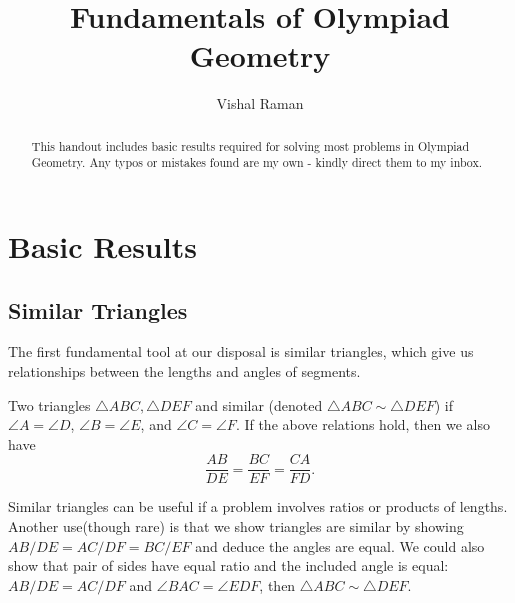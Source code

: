 \documentclass[12pt]{scrartcl}
\newcommand{\<}{\langle}
\renewcommand{\>}{\rangle}
\begin{document}
\title{Fundamentals of Olympiad Geometry}
\author{Vishal Raman}
\maketitle
\begin{abstract}
This handout includes basic results required for solving most problems in Olympiad Geometry.  Any typos or mistakes found are my own - kindly direct them to my inbox.
\end{abstract}
\tableofcontents
\pagebreak
\section{Basic Results}
\subsection{Similar Triangles}
The first fundamental tool at our disposal is similar triangles, which give us relationships between the lengths and angles of segments.  \begin{definition} Two triangles $\triangle ABC, \triangle DEF$ and similar (denoted $\triangle ABC \sim \triangle DEF$) if $\angle A = \angle D$, $\angle B = \angle E$, and $\angle C = \angle F$.  If the above relations hold, then we also have
$$\frac{AB}{DE} = \frac{BC}{EF} = \frac{CA}{FD}.$$
\end{definition}

Similar triangles can be useful if a problem involves ratios or products of lengths.  Another use(though rare) is that we show triangles are similar by showing $AB/DE = AC/DF = BC/EF$ and deduce the angles are equal.  We could also show that pair of sides have equal ratio and the included angle is equal: $AB/DE = AC/DF$ and $\angle BAC = \angle EDF$, then $\triangle ABC \sim \triangle DEF$.
\end{document}
